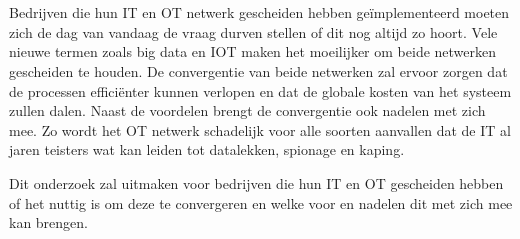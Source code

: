 
\section{}
\label{sec:probleemstelling}


Bedrijven die hun IT en OT netwerk gescheiden hebben geïmplementeerd moeten zich de dag van vandaag de vraag durven stellen of dit nog altijd zo hoort. Vele nieuwe termen zoals big data en IOT maken het moeilijker om beide netwerken gescheiden te houden. De convergentie van beide netwerken zal ervoor zorgen dat de processen efficiënter kunnen verlopen en dat de globale kosten van het systeem zullen dalen. Naast de voordelen brengt de convergentie ook nadelen met zich mee. Zo wordt het OT netwerk schadelijk voor alle soorten aanvallen dat de IT al jaren teisters wat kan leiden tot datalekken, spionage en kaping.

Dit onderzoek zal uitmaken voor bedrijven die hun IT en OT gescheiden hebben of het nuttig is om deze te convergeren en welke voor en nadelen dit met zich mee kan brengen.



\section{}
\label{sec:onderzoeksvraag}
